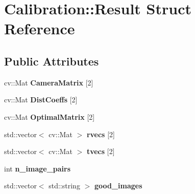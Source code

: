 \hypertarget{struct_calibration_1_1_result}{}\section{Calibration\+::Result Struct Reference}
\label{struct_calibration_1_1_result}
\subsection*{Public Attributes}
\begin{DoxyCompactItemize}
\item 
\mbox{\label{struct_calibration_1_1_result_a308843e10ccb36365fe128e90c15e573}} 
cv\+::\+Mat {\bfseries Camera\+Matrix} \mbox{[}2\mbox{]}
\item 
\mbox{\label{struct_calibration_1_1_result_a3ec3ec7b9beda840837eb67e93d73a16}} 
cv\+::\+Mat {\bfseries Dist\+Coeffs} \mbox{[}2\mbox{]}
\item 
\mbox{\label{struct_calibration_1_1_result_a8724f192b64036e2767bc66730858679}} 
cv\+::\+Mat {\bfseries Optimal\+Matrix} \mbox{[}2\mbox{]}
\item 
\mbox{\label{struct_calibration_1_1_result_a4ac661ca94dba69a389915d6d039fa8f}} 
std\+::vector$<$ cv\+::\+Mat $>$ {\bfseries rvecs} \mbox{[}2\mbox{]}
\item 
\mbox{\label{struct_calibration_1_1_result_ac79af5487560cfb35f9f8daf04720614}} 
std\+::vector$<$ cv\+::\+Mat $>$ {\bfseries tvecs} \mbox{[}2\mbox{]}
\item 
\mbox{\label{struct_calibration_1_1_result_a11213e516c6993eeec0d2da4f5501f41}} 
int {\bfseries n\+\_\+image\+\_\+pairs}
\item 
\mbox{\label{struct_calibration_1_1_result_a760051e5efcc64ec76679d57951ba9c9}} 
std\+::vector$<$ std\+::string $>$ {\bfseries good\+\_\+images}
\item 
\mbox{\label{struct_calibration_1_1_result_abc2f737f87a9e5899cbc64f08b98398e}} 

\end{DoxyCompactItemize}
